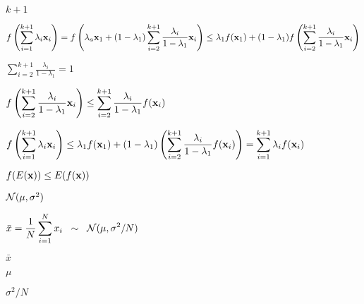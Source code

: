 \documentclass{article}
\def\lthtmlcheckvsize{\ifdim\ht\sizebox<\vsize 
  \ifdim\wd\sizebox<\hsize\expandafter\hfill\fi \expandafter\vfill
  \else\expandafter\vss\fi}%
\begin{document}
{\newpage\clearpage
{}%
$ k+1$%
\lthtmlindisplaymathZ
\lthtmlcheckvsize\clearpage}

{\newpage\clearpage
{}%
$\displaystyle f\left(\sum_{i=1}^{k+1} \lambda_i{\bf x}_i\right)
=f\left(\lambda_a{\bf x}_1+(1-\lambda_1)\sum_{i=2}^{k+1}
\frac{\lambda_i}{1-\lambda_1}{\bf x}_i\right)
\le \lambda_1f({\bf x}_1)+(1-\lambda_1)f\left(\sum_{i=2}^{k+1}
\frac{\lambda_i}{1-\lambda_1}{\bf x}_i\right)$%
\lthtmlindisplaymathZ
\lthtmlcheckvsize\clearpage}

{\newpage\clearpage
{}%
$\displaystyle \sum_{i=2}^{k+1} \frac{\lambda_i}{1-\lambda_1}=1$%
\lthtmlindisplaymathZ
\lthtmlcheckvsize\clearpage}

{\newpage\clearpage
{}%
$\displaystyle f\left(\sum_{i=2}^{k+1}
\frac{\lambda_i}{1-\lambda_1}{\bf x}_i\right)\le
\sum_{i=2}^{k+1}\frac{\lambda_i}{1-\lambda_1}f({\bf x}_i)$%
\lthtmlindisplaymathZ
\lthtmlcheckvsize\clearpage}

{\newpage\clearpage
{}%
$\displaystyle f\left(\sum_{i=1}^{k+1} \lambda_i {\bf x}_i\right)
\le \lambda_1f({\bf x}_1)+(1-\lambda_1)\left(
\sum_{i=2}^{k+1}\frac{\lambda_i}{1-\lambda_1}f({\bf x}_i)\right)
=\sum_{i=1}^{k+1}\lambda_if({\bf x}_i)$%
\lthtmlindisplaymathZ
\lthtmlcheckvsize\clearpage}

{\newpage\clearpage
{}%
$\displaystyle f(E({\bf x})) \le E(f({\bf x}))$%
\lthtmlindisplaymathZ
\lthtmlcheckvsize\clearpage}

{\newpage\clearpage
{}%
$ {\cal N}(\mu,\sigma^2)$%
\lthtmlindisplaymathZ
\lthtmlcheckvsize\clearpage}

{\newpage\clearpage
{}%
$\displaystyle \bar{x}=\frac{1}{N}\sum_{i=1}^N x_i \;\;\sim\;\; {\cal N}(\mu, \sigma^2/N)$%
\lthtmlindisplaymathZ
\lthtmlcheckvsize\clearpage}

{\newpage\clearpage
{}%
$ \bar{x}$%
\lthtmlindisplaymathZ
\lthtmlcheckvsize\clearpage}

{\newpage\clearpage
{}%
$ \mu$%
\lthtmlindisplaymathZ
\lthtmlcheckvsize\clearpage}

{\newpage\clearpage
{}%
$ \sigma^2/N$%
\lthtmlindisplaymathZ
\lthtmlcheckvsize\clearpage}
\end{document}
